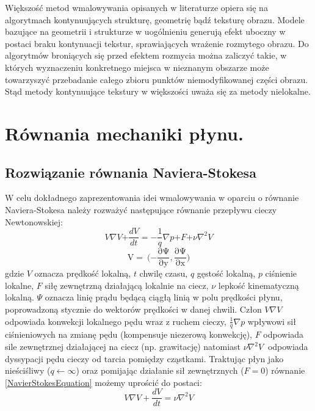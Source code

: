 \documentclass[12pt, twoside, openany]{report}
\theoremstyle{definition}
\begin{document}
Większość metod wmalowywania opisanych w literaturze opiera się na algorytmach kontynuujących strukturę, geometrię bądź teksturę obrazu. Modele bazujące na geometrii i strukturze w uogólnieniu generują efekt uboczny w postaci braku kontynuacji tekstur, sprawiających wrażenie rozmytego obrazu. Do algorytmów broniących się przed efektem rozmycia można zaliczyć takie, w których wyznaczeniu konkretnego miejsca w nieznanym obszarze może towarzyszyć przebadanie całego zbioru punktów niemodyfikowanej części obrazu. Stąd metody kontynuujące tekstury w większości uważa się za metody nielokalne.
\chapter{Równania mechaniki płynu.}
\label{chap:navierstokes}
\section{Rozwiązanie równania Naviera-Stokesa }
W celu dokładnego zaprezentowania idei wmalowywania w oparciu o równanie Naviera-Stokesa należy rozważyć następujące równanie przepływu cieczy Newtonowskiej:
\begin{equation}
V \nabla V \mathrm{+} \frac{dV}{dt} = - \frac{\mathrm{1}}{q}\nabla p\mathrm{+}F \mathrm{+}\nu {\nabla }^{\mathrm{2}} V
\label{NavierStokesEquation}
\end{equation}
\begin{equation}
\mathrm{V=\ (-}\frac{\mathrm{\partial }\mathrm{\Psi }}{\mathrm{\partial }\mathrm{y}},\frac{\mathrm{\partial }\mathrm{\Psi }}{\mathrm{\partial }\mathrm{x}}\mathrm{)}
\label{LiquidVelociy}
\end{equation}
gdzie $V$ oznacza prędkość lokalną, $t$ chwilę czasu, $q$ gęstość lokalną, $p$ ciśnienie lokalne, $F$ siłę zewnętrzną działającą lokalnie na ciecz, $\nu$ lepkość kinematyczną lokalną. $\mathit{\Psi}$ oznacza linię prądu będącą ciągłą linią w polu prędkości płynu, poprowadzoną
stycznie do wektorów prędkości w danej chwili. Człon $V\nabla V$ odpowiada konwekcji lokalnego pędu wraz z ruchem cieczy, $\frac{1}{q}\nabla p$ wpływowi sił ciśnieniowych na zmianę pędu (kompensuje niezerową konwekcję),  $F$ odpowiada sile zewnętrznej działającej na ciecz (np. grawitację) natomiast $\nu {\nabla }^2V\ $ odpowiada dyssypacji pędu cieczy od tarcia pomiędzy cząstkami. Traktując płyn jako nieściśliwy ($q \leftarrow \infty $)  oraz pomijając działanie sił zewnętrznych ($F=0$)  równanie \eqref{NavierStokesEquation} możemy uprościć do postaci:
\begin{equation}
 V\nabla V+\frac{dV}{dt}=\nu {\nabla }^2V
\label{NavierStokesEquationShort}
\end{equation}
\end{document}
